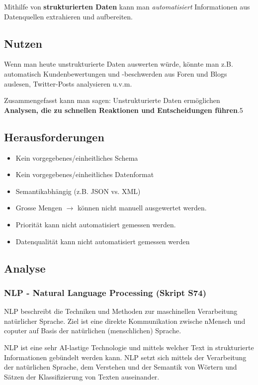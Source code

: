 \documentclass[a4paper, 11pt, nofootinbib]{article}
\begin{document}
Mithilfe von \textbf{strukturierten Daten} kann man \textit{automatisiert} Informationen aus Datenquellen extrahieren und aufbereiten.

\subsection{Nutzen}

\noindent Wenn man heute unstrukturierte Daten auswerten würde, könnte man z.B. automatisch Kundenbewertungen und -beschwerden aus Foren und Blogs auslesen, Twitter-Posts analysieren u.v.m. 

Zusammengefasst kann man sagen: Unstrukturierte Daten ermöglichen \textbf{Analysen, die zu schnellen Reaktionen und Entscheidungen führen}.5

\subsection{Herausforderungen}

\begin{itemize}
	\item Kein vorgegebenes/einheitliches Schema
	\item Kein vorgegebenes/einheitliches Datenformat
	\item Semantikabhängig (z.B. JSON vs. XML)
	\item Grosse Mengen $\rightarrow$ können nicht manuell ausgewertet werden.
	\item Priorität kann nicht automatisiert gemessen werden.
	\item Datenqualität kann nicht automatisiert gemessen werden
\end{itemize}

\subsection{Analyse}

\subsubsection{NLP - Natural Language Processing (Skript S74)}
 NLP beschreibt die Techniken und Methoden zur maschinellen Verarbeitung natürlicher Sprache. Ziel ist eine direkte Kommunikation zwische nMensch und coputer auf Basis der natürlichen (menschlichen) Sprache.

NLP ist eine sehr AI-lastige Technologie und mittels welcher Text in strukturierte Informationen gebündelt werden kann. NLP setzt sich mittels der Verarbeitung der natürlichen Sprache, dem Verstehen und der Semantik von 
Wörtern und Sätzen der Klassifizierung von Texten auseinander.
\end{document}
